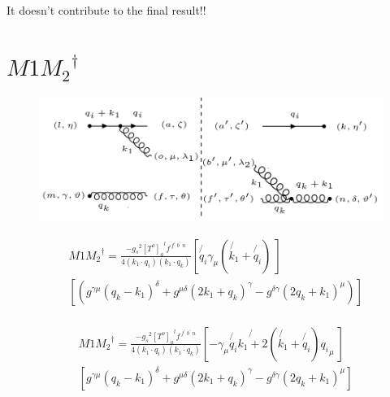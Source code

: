 It doesn't contribute to the final result!!

\pagebreak

\section{$ M1{M_2}^{\dagger} $}

\begin{figure}[ht!]
\centering
\includegraphics[scale=0.7]{images/GQ/M1M2DaggerGluon.png}
\end{figure}

\begin{equation}
\begin{split}
&M1{M_2}^{\dagger}=\frac{-{g_s}^2 {[T^{o}]_a}^{l} f^{\:f^{\prime}\: b^{\prime}\:n}}{4(k_1 \cdot q_i)(k_1 \cdot q_k)}[\not{q_i}{\gamma}_{\mu}(\not{k_1}+\not{q_i})\:]\\
&[ (g^{{{\gamma}}{{\mu}}}(q_k-k_1)^{\delta}+g^{{{\mu}}{{\delta}}}(2k_1 +q_k)^{{\gamma}}-g^{\delta{{\gamma}}}(2q_k+k_1)^{{\mu}})]\\
\end{split}
\end{equation}

\begin{equation}
\begin{split}
&M1{M_2}^{\dagger}=\frac{-{g_s}^2 {[T^{o}]_a}^{l} f^{\:f^{\prime}\: b^{\prime}\:n}}{4(k_1 \cdot q_i)(k_1 \cdot q_k)}[-\gamma_{\mu}\not{q_i}\not{k_1+2}(\not{k_1}+\not{q_i}){q_i}_{\mu}\:]\\
&[ g^{{{\gamma}}{{\mu}}}(q_k-k_1)^{\delta}+g^{{{\mu}}{{\delta}}}(2k_1+q_k )^{{\gamma}}-g^{\delta{{\gamma}}}(2q_k+k_1)^{{\mu}}]\\
\end{split}
\end{equation}

